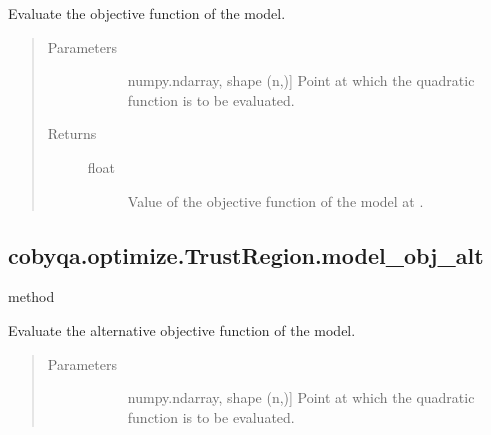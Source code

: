 \documentclass[letterpaper,10pt,english]{sphinxmanual}
\begin{document}
\begin{fulllineitems}
\begin{fulllineitems}
\label{\detokenize{refs/generated/cobyqa.optimize.TrustRegion.model_obj:cobyqa.optimize.TrustRegion.model_obj}}
\sphinxAtStartPar
Evaluate the objective function of the model.
\begin{quote}\begin{description}
\item[{Parameters}] \leavevmode\begin{description}
\item[{}] \leavevmode{[}numpy.ndarray, shape (n,){]}
\sphinxAtStartPar
Point at which the quadratic function is to be evaluated.

\end{description}

\item[{Returns}] \leavevmode\begin{description}
\item[{float}] \leavevmode
\sphinxAtStartPar
Value of the objective function of the model at .

\end{description}

\end{description}\end{quote}

\end{fulllineitems}



\subsection{cobyqa.optimize.TrustRegion.model\_obj\_alt}
\label{\detokenize{refs/generated/cobyqa.optimize.TrustRegion.model_obj_alt:cobyqa-optimize-trustregion-model-obj-alt}}\label{\detokenize{refs/generated/cobyqa.optimize.TrustRegion.model_obj_alt::doc}}
\sphinxAtStartPar
method

\begin{fulllineitems}
\label{\detokenize{refs/generated/cobyqa.optimize.TrustRegion.model_obj_alt:cobyqa.optimize.TrustRegion.model_obj_alt}}
\sphinxAtStartPar
Evaluate the alternative objective function of the model.
\begin{quote}\begin{description}
\item[{Parameters}] \leavevmode\begin{description}
\item[{}] \leavevmode{[}numpy.ndarray, shape (n,){]}
\sphinxAtStartPar
Point at which the quadratic function is to be evaluated.


\end{description}
\end{description}
\end{quote}
\end{fulllineitems}
\end{fulllineitems}
\end{document}
